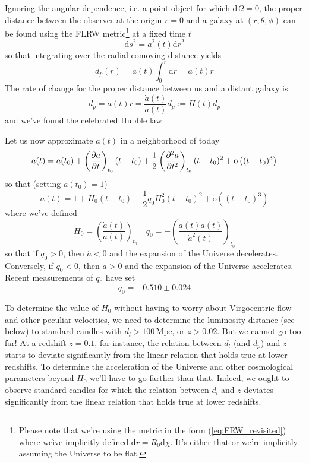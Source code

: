 Ignoring the angular dependence, i.e. a point object for which $\text{d}\Omega = 0$, the proper distance between the observer at the origin $r = 0$ and a galaxy at $(r,\theta,\phi)$ can be found using the FLRW metric\footnote{Please note that we're using the metric in the form (\ref{eq:FRW_revisited}) where weìve implicitly defined $\text{d}r = R_{0}\text{d}\chi$. It's either that or we're implicitly assuming the Universe to be flat.} at a fixed time $t$
\begin{equation*}
    \text{d}s^{2} = a^{2}(t)\text{d}r^{2}
\end{equation*}
so that integrating over the radial comoving distance yields
\begin{equation}
    d_{p}(r) = a(t)\int_{0}^{r}\text{d}r = a(t)r
    \label{eq:properdistance}
\end{equation}
The rate of change for the proper distance between us and a distant galaxy is 
\begin{equation*}
    \dot{d}_{p} = \dot{a}(t)r = \frac{\dot{a}(t)}{a(t)}d_{p} := H(t)d_{p}
\end{equation*}
and we've found the celebrated Hubble law.
\par Let us now approximate $a(t)$ in a neighborhood of today
\begin{equation*}
    a(t) = a(t_{0}) + \left(\frac{\partial a}{\partial t}\right)_{t_{0}}(t-t_{0}) + \frac{1}{2}\left(\frac{\partial^{2} a}{\partial t^{2}}\right)_{t_{0}}(t-t_{0})^{2} + \text{o}\left((t-t_{0})^{3}\right)
\end{equation*}
so that (setting $a(t_{0}) = 1$)
\begin{equation}
    a(t) = 1 + H_{0}(t-t_{0})-\frac{1}{2}q_{0}H_{0}^{2}(t-t_{0})^{2} + \text{o}\left((t-t_{0})^{3}\right)
    \label{eq:a_expansion}
\end{equation}
where we've defined 
\begin{equation}
    H_{0} = \left(\frac{\dot{a}(t)}{a(t)}\right)_{t_{0}} \quad q_{0} = -\left(\frac{\ddot{a}(t)a(t)}{\dot{a}^{2}(t)}\right)_{t_{0}}
    \label{eq:expansion_param}
\end{equation}
so that if $q_{0} > 0$, then $\ddot{a} < 0$ and the expansion of the Universe decelerates. Conversely, if $q_{0} < 0$, then $\ddot{a} > 0$ and the expansion of the Universe accelerates. Recent measurements of $q_{0}$ \cite{Riess_2022} have set
\begin{equation}
    q_{0} = -0.510 \pm 0.024
    \label{eq:acceleration_param}
\end{equation}
\par To determine the value of $H_{0}$ without having to worry about Virgocentric flow and other peculiar velocities, we need to determine the luminosity distance (see below) to standard candles with $d_{l} > 100\,\text{Mpc}$, or $z > 0.02$. But we cannot go too far! At a redshift $z = 0.1$, for instance, the relation between $d_{l}$ (and $d_{p}$) and $z$ starts to deviate significantly from the linear relation that holds true at lower redshifts. To determine the acceleration of the Universe and other cosmological parameters beyond $H_{0}$ we'll have to go farther than that. Indeed, we ought to observe standard candles for which the relation between $d_{l}$ and $z$ deviates significantly from the linear relation that holds true at lower redshifts.
